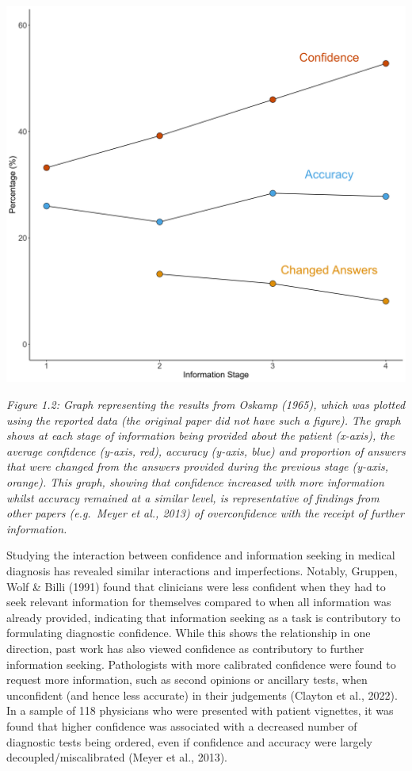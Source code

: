 \documentclass[a4paper, nobind]{templates/ociamthesis}
\begin{document}
\newpage

\begin{center}\includegraphics[width=1\linewidth]{./assets/OskampGraph} \end{center}

\emph{Figure 1.2: Graph representing the results from Oskamp (1965), which was plotted using the reported data (the original paper did not have such a figure). The graph shows at each stage of information being provided about the patient (x-axis), the average confidence (y-axis, red), accuracy (y-axis, blue) and proportion of answers that were changed from the answers provided during the previous stage (y-axis, orange). This graph, showing that confidence increased with more information whilst accuracy remained at a similar level, is representative of findings from other papers (e.g.~Meyer et al., 2013) of overconfidence with the receipt of further information.}

\hfill\break
Studying the interaction between confidence and information seeking in medical diagnosis has revealed similar interactions and imperfections. Notably, Gruppen, Wolf \& Billi (1991) found that clinicians were less confident when they had to seek relevant information for themselves compared to when all information was already provided, indicating that information seeking as a task is contributory to formulating diagnostic confidence. While this shows the relationship in one direction, past work has also viewed confidence as contributory to further information seeking. Pathologists with more calibrated confidence were found to request more information, such as second opinions or ancillary tests, when unconfident (and hence less accurate) in their judgements (Clayton et al., 2022). In a sample of 118 physicians who were presented with patient vignettes, it was found that higher confidence was associated with a decreased number of diagnostic tests being ordered, even if confidence and accuracy were largely decoupled/miscalibrated (Meyer et al., 2013).
\end{document}
